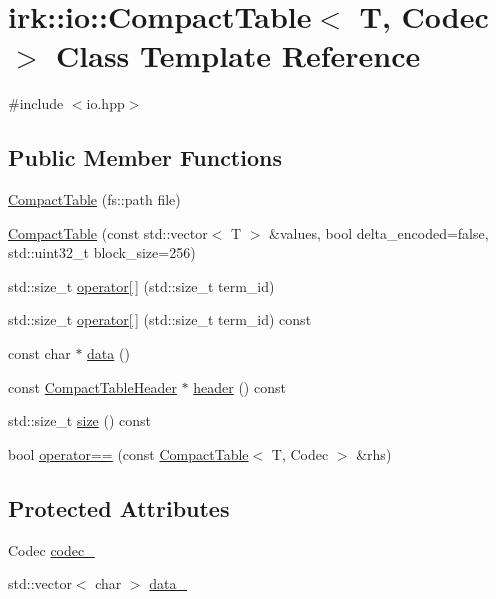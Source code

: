 \hypertarget{classirk_1_1io_1_1CompactTable}{}\section{irk\+:\+:io\+:\+:Compact\+Table$<$ T, Codec $>$ Class Template Reference}
\label{classirk_1_1io_1_1CompactTable}


{\ttfamily \#include $<$io.\+hpp$>$}

\subsection*{Public Member Functions}
\begin{DoxyCompactItemize}
\item 
\mbox{\hyperlink{classirk_1_1io_1_1CompactTable_a0b553fac209600eff4d053326e79db29}{Compact\+Table}} (fs\+::path file)
\item 
\mbox{\hyperlink{classirk_1_1io_1_1CompactTable_a902c0982ec971a8c49d39d8ab66c4d6c}{Compact\+Table}} (const std\+::vector$<$ T $>$ \&values, bool delta\+\_\+encoded=false, std\+::uint32\+\_\+t block\+\_\+size=256)
\item 
std\+::size\+\_\+t \mbox{\hyperlink{classirk_1_1io_1_1CompactTable_a97e7ae09cdee4060a25d74e062b517ca}{operator\mbox{[}$\,$\mbox{]}}} (std\+::size\+\_\+t term\+\_\+id)
\item 
std\+::size\+\_\+t \mbox{\hyperlink{classirk_1_1io_1_1CompactTable_a6107e174e27e7dd3c2f2fdc7a4397696}{operator\mbox{[}$\,$\mbox{]}}} (std\+::size\+\_\+t term\+\_\+id) const
\item 
const char $\ast$ \mbox{\hyperlink{classirk_1_1io_1_1CompactTable_a1d8802794d6a4b2ae510668846bb1cd8}{data}} ()
\item 
const \mbox{\hyperlink{structirk_1_1io_1_1CompactTableHeader}{Compact\+Table\+Header}} $\ast$ \mbox{\hyperlink{classirk_1_1io_1_1CompactTable_a621defbc59ae57dad8f5e5ff4c79c789}{header}} () const
\item 
std\+::size\+\_\+t \mbox{\hyperlink{classirk_1_1io_1_1CompactTable_a6b3516a5cb3593d2e1f85620ef7ae3fd}{size}} () const
\item 
bool \mbox{\hyperlink{classirk_1_1io_1_1CompactTable_afd291823aa610f9c1bc2eb1a6f5f21c0}{operator==}} (const \mbox{\hyperlink{classirk_1_1io_1_1CompactTable}{Compact\+Table}}$<$ T, Codec $>$ \&rhs)
\end{DoxyCompactItemize}
\subsection*{Protected Attributes}
\begin{DoxyCompactItemize}
\item 
Codec \mbox{\hyperlink{classirk_1_1io_1_1CompactTable_a8698a3887b96c02a3b5f134bc3d1fdde}{codec\+\_\+}}
\item 
std\+::vector$<$ char $>$ \mbox{\hyperlink{classirk_1_1io_1_1CompactTable_aa55d106e2d93e23efe731078be71eae9}{data\+\_\+}}
\end{DoxyCompactItemize}
